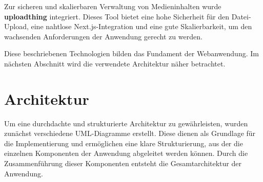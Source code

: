 Zur sicheren und skalierbaren Verwaltung von Medieninhalten wurde \textbf{uploadthing} integriert. Dieses Tool bietet eine hohe Sicherheit für den Datei-Upload, eine 
nahtlose Next.js-Integration und eine gute Skalierbarkeit, um den wachsenden Anforderungen der Anwendung gerecht zu werden.

Diese beschriebenen Technologien bilden das Fundament der Webanwendung. Im nächsten Abschnitt wird die verwendete Architektur näher betrachtet.

\section{Architektur}
\label{sec:chapter2-2}

Um eine durchdachte und strukturierte Architektur zu gewährleisten, wurden zunächst verschiedene \ac{UML}-Diagramme erstellt. Diese dienen als 
Grundlage für die Implementierung und ermöglichen eine klare Strukturierung, aus der die einzelnen Komponenten der Anwendung abgeleitet werden können. Durch die 
Zusammenführung dieser Komponenten entsteht die Gesamtarchitektur der Anwendung.

